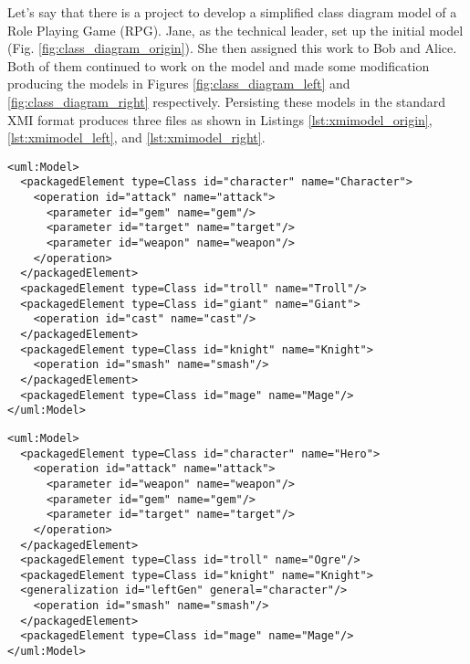 Let's say that there is a project to develop a simplified class diagram model of a Role Playing Game (RPG). Jane, as the technical leader, set up the initial model (Fig. \ref{fig:class_diagram_origin}). She then assigned this work to Bob and Alice. Both of them continued to work on the model and made some modification producing the models in Figures \ref{fig:class_diagram_left} and \ref{fig:class_diagram_right} respectively. Persisting these models in the standard XMI \cite{omg2018xmi} format produces three files as shown in Listings \ref{lst:xmimodel_origin}, \ref{lst:xmimodel_left}, and \ref{lst:xmimodel_right}.

\vspace{-20pt}
\begin{lstlisting}[style=xmi,caption={Simplified XMI file of the original version in Figure \ref{fig:class_diagram_origin}.},label=lst:xmimodel_origin]
<uml:Model>
  <packagedElement type=Class id="character" name="Character">
    <operation id="attack" name="attack">
      <parameter id="gem" name="gem"/>
      <parameter id="target" name="target"/>
      <parameter id="weapon" name="weapon"/>
    </operation>
  </packagedElement>
  <packagedElement type=Class id="troll" name="Troll"/>
  <packagedElement type=Class id="giant" name="Giant">
    <operation id="cast" name="cast"/>
  </packagedElement>
  <packagedElement type=Class id="knight" name="Knight">
    <operation id="smash" name="smash"/>
  </packagedElement>
  <packagedElement type=Class id="mage" name="Mage"/>
</uml:Model>
\end{lstlisting}

\vspace{-20pt}
\begin{lstlisting}[style=xmi,caption={Simplified XMI file of the left version in Figure \ref{fig:class_diagram_left}.},label=lst:xmimodel_left]
<uml:Model>
  <packagedElement type=Class id="character" name="Hero">
    <operation id="attack" name="attack">
      <parameter id="weapon" name="weapon"/>
      <parameter id="gem" name="gem"/>
      <parameter id="target" name="target"/>
    </operation>  
  </packagedElement>
  <packagedElement type=Class id="troll" name="Ogre"/>
  <packagedElement type=Class id="knight" name="Knight">
  <generalization id="leftGen" general="character"/>
    <operation id="smash" name="smash"/>
  </packagedElement>
  <packagedElement type=Class id="mage" name="Mage"/>
</uml:Model>
\end{lstlisting}

